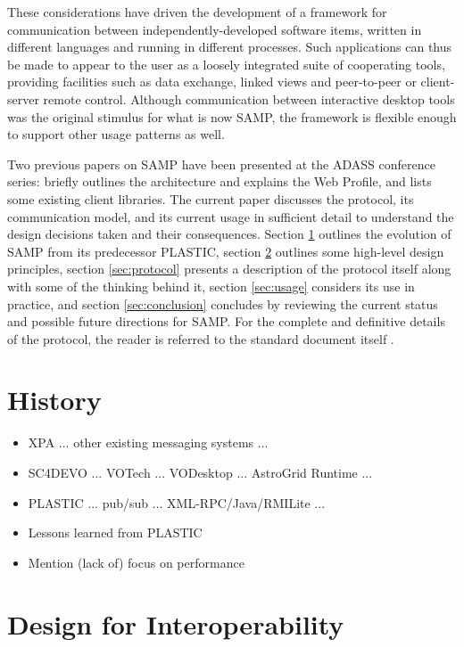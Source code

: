 \documentclass[5p]{elsarticle}
\newcommand{\todo}{\color{gray}}
\begin{document}
These considerations have driven the development of a framework
for communication between independently-developed software items,
written in different languages and running in different processes.
Such applications can thus be made to appear to the user
as a loosely integrated suite of cooperating tools,
providing facilities such as data exchange, linked views and
peer-to-peer or client-server remote control.
Although communication between interactive desktop tools was the
original stimulus for what is now SAMP, the framework is flexible
enough to support other usage patterns as well.

Two previous papers on SAMP have been presented at the ADASS conference
series:
\citet{adassxxi_paper} briefly outlines the architecture and explains
the Web Profile, and \citet{adassxxii_bof} lists some existing
client libraries.
The current paper discusses the protocol,
its communication model, and its current usage
in sufficient detail to understand the design decisions taken
and their consequences.
Section \ref{sec:history} outlines the evolution of SAMP from
its predecessor PLASTIC,
section \ref{sec:design} outlines some high-level design principles,
section \ref{sec:protocol} presents a description of the protocol itself
along with some of the thinking behind it,
section \ref{sec:usage} considers its use in practice, and
section \ref{sec:conclusion} concludes by reviewing the current status
and possible future directions for SAMP.
For the complete and definitive details of the protocol,
the reader is referred to the standard document itself \citep{samp_std}.

{\todo
\section{History} \label{sec:history}
 
  \begin{itemize}
  \item XPA ... other existing messaging systems ...
  \item SC4DEVO ... VOTech ... VODesktop ... AstroGrid Runtime ...
  \item PLASTIC\citep{plastic_note} ... pub/sub ... XML-RPC/Java/RMILite ...
  \item Lessons learned from PLASTIC
  \item Mention (lack of) focus on performance
  \end{itemize}
}


\section{Design for Interoperability} \label{sec:design}
\end{document}
